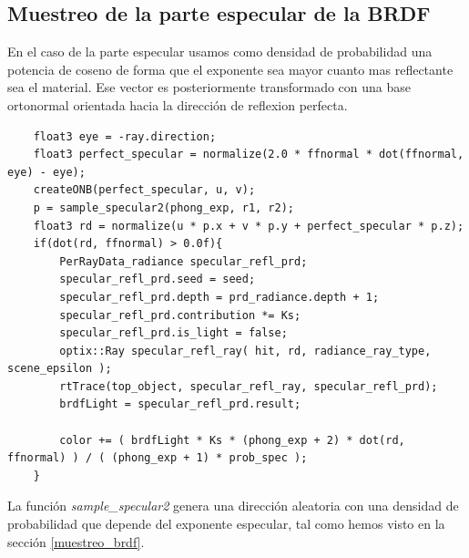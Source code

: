 \clearpage

\subsection{Muestreo de la parte especular de la BRDF}

En el caso de la parte especular usamos como densidad de probabilidad una potencia de coseno de forma que el exponente sea mayor cuanto mas reflectante sea el material. Ese vector es posteriormente transformado con una base ortonormal orientada hacia la dirección de reflexion perfecta.

\begin{lstlisting}
	float3 eye = -ray.direction;
	float3 perfect_specular = normalize(2.0 * ffnormal * dot(ffnormal, eye) - eye);
	createONB(perfect_specular, u, v);
	p = sample_specular2(phong_exp, r1, r2);
	float3 rd = normalize(u * p.x + v * p.y + perfect_specular * p.z);
	if(dot(rd, ffnormal) > 0.0f){
		PerRayData_radiance specular_refl_prd;
		specular_refl_prd.seed = seed;
		specular_refl_prd.depth = prd_radiance.depth + 1;
		specular_refl_prd.contribution *= Ks;
		specular_refl_prd.is_light = false;
		optix::Ray specular_refl_ray( hit, rd, radiance_ray_type, scene_epsilon );
		rtTrace(top_object, specular_refl_ray, specular_refl_prd);
		brdfLight = specular_refl_prd.result;
				
		color += ( brdfLight * Ks * (phong_exp + 2) * dot(rd, ffnormal) ) / ( (phong_exp + 1) * prob_spec );
	}

\end{lstlisting}

La función \emph{sample\_specular2} genera una dirección aleatoria con una densidad de probabilidad que depende del exponente especular, tal como hemos visto en la sección \ref{muestreo_brdf}.

